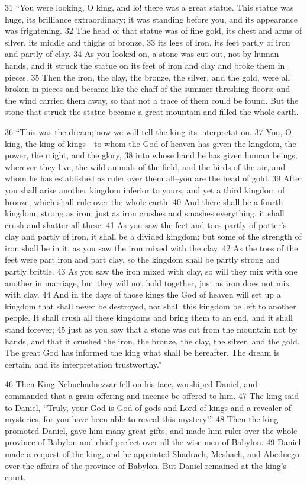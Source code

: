31 ``You were looking, O king, and lo! there was a great statue. This statue 
was huge, its brilliance extraordinary; it was standing before you, and its 
appearance was frightening. 32 The head of that statue was of fine gold, its 
chest and arms of silver, its middle and thighs of bronze, 33 its legs of iron, 
its feet partly of iron and partly of clay. 34 As you looked on, a stone was 
cut out, not by human hands, and it struck the statue on its feet of iron and 
clay and broke them in pieces. 35 Then the iron, the clay, the bronze, the 
silver, and the gold, were all broken in pieces and became like the chaff of 
the summer threshing floors; and the wind carried them away, so that not a 
trace of them could be found. But the stone that struck the statue became a 
great mountain and filled the whole earth.

36 ``This was the dream; now we will tell the king its interpretation. 37 You, O 
king, the king of kings—to whom the God of heaven has given the kingdom, the 
power, the might, and the glory, 38 into whose hand he has given human beings, 
wherever they live, the wild animals of the field, and the birds of the air, 
and whom he has established as ruler over them all--you are the head of gold. 
39 After you shall arise another kingdom inferior to yours, and yet a third 
kingdom of bronze, which shall rule over the whole earth. 40 And there shall be 
a fourth kingdom, strong as iron; just as iron crushes and smashes everything, 
it shall crush and shatter all these. 41 As you saw the feet and toes partly of 
potter's clay and partly of iron, it shall be a divided kingdom; but some of 
the strength of iron shall be in it, as you saw the iron mixed with the clay. 
42 As the toes of the feet were part iron and part clay, so the kingdom shall 
be partly strong and partly brittle. 43 As you saw the iron mixed with clay, 
so will they mix with one another in marriage, but they will not hold together, 
just as iron does not mix with clay. 44 And in the days of those kings the God 
of heaven will set up a kingdom that shall never be destroyed, nor shall this 
kingdom be left to another people. It shall crush all these kingdoms and bring 
them to an end, and it shall stand forever; 45 just as you saw that a stone was 
cut from the mountain not by hands, and that it crushed the iron, the bronze, 
the clay, the silver, and the gold. The great God has informed the king what 
shall be hereafter. The dream is certain, and its interpretation trustworthy.''

46 Then King Nebuchadnezzar fell on his face, worshiped Daniel, and commanded 
that a grain offering and incense be offered to him. 47 The king said to Daniel,
``Truly, your God is God of gods and Lord of kings and a revealer of mysteries, 
for you have been able to reveal this mystery!'' 48 Then the king promoted 
Daniel, gave him many great gifts, and made him ruler over the whole province 
of Babylon and chief prefect over all the wise men of Babylon. 49 Daniel made 
a request of the king, and he appointed Shadrach, Meshach, and Abednego over 
the affairs of the province of Babylon. But Daniel remained at the king's court.
